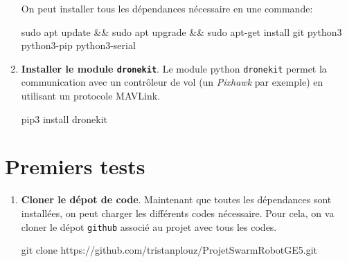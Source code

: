 \documentclass[a4paper, 10pt]{article}
\begin{document}
\begin{enumerate}
	On peut installer tous les dépendances nécessaire en une commande:
\begin{commandshell}
sudo apt update && sudo apt upgrade && sudo apt-get install git python3 python3-pip python3-serial
\end{commandshell}

	\item\textbf{Installer le module \texttt{dronekit}}. 
	Le module python \texttt{dronekit} permet la communication avec un
	contrôleur de vol (un \textit{Pixhawk} par exemple) en 
	utilisant un protocole MAVLink.
	
\begin{commandshell}
pip3 install dronekit
\end{commandshell}
\end{enumerate}

\section{Premiers tests}
\begin{enumerate}

	\item\textbf{Cloner le dépot de code}.
	Maintenant que toutes les dépendances sont installées, on peut charger les différents codes nécessaire.
	Pour cela, on va cloner le dépot \texttt{github} associé au projet avec tous les codes.
\begin{commandshell}
git clone https://github.com/tristanplouz/ProjetSwarmRobotGE5.git
\end{commandshell}
\end{enumerate}
\end{document}
